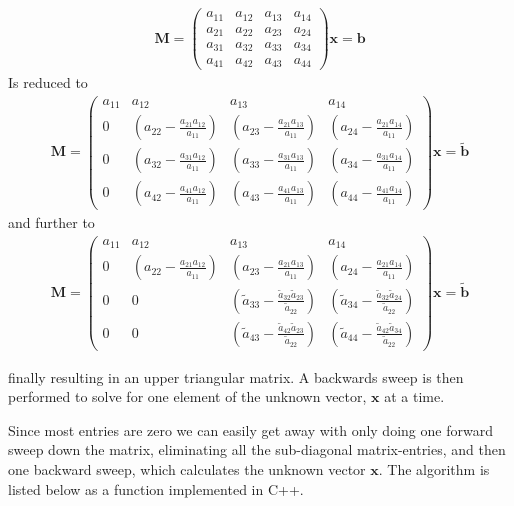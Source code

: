 \begin{align}
  \mathbf{M} = 
 \left( \begin{array}{rrrr}
 a_{11} & a_{12} & a_{13} & a_{14} \\
 a_{21} & a_{22} & a_{23} & a_{24} \\
 a_{31} & a_{32} & a_{33} & a_{34} \\
 a_{41} & a_{42} & a_{43} & a_{44}
 \end{array} \right)\mathbf{x} = \mathbf{b}
\end{align}
Is reduced to
\begin{align}
  \mathbf{M} = 
 \left( \begin{array}{rrrr}
 a_{11} & a_{12} & a_{13} & a_{14} \\
 0 & (a_{22}-\frac{a_{21}a_{12}}{a_{11}}) & (a_{23}-\frac{a_{21}a_{13}}{a_{11}}) & (a_{24}-\frac{a_{21}a_{14}}{a_{11}}) \\
 0 & (a_{32}-\frac{a_{31}a_{12}}{a_{11}}) & (a_{33}-\frac{a_{31}a_{13}}{a_{11}}) & (a_{34}-\frac{a_{31}a_{14}}{a_{11}}) \\
 0 & (a_{42}-\frac{a_{41}a_{12}}{a_{11}}) & (a_{43}-\frac{a_{41}a_{13}}{a_{11}}) & (a_{44}-\frac{a_{41}a_{14}}{a_{11}})
 \end{array} \right)\mathbf{x} = \tilde{\mathbf{b}}
\end{align}
and further to
\begin{align}
  \mathbf{M} = 
 \left( \begin{array}{rrrr}
 a_{11} & a_{12} & a_{13} & a_{14} \\
 0 & (a_{22}-\frac{a_{21}a_{12}}{a_{11}}) & (a_{23}-\frac{a_{21}a_{13}}{a_{11}}) & (a_{24}-\frac{a_{21}a_{14}}{a_{11}}) \\
 0 & 0 & (\tilde{a}_{33}-\frac{\tilde{a}_{32}\tilde{a}_{23}}{\tilde{a}_{22}}) & (\tilde{a}_{34}-\frac{\tilde{a}_{32}\tilde{a}_{24}}{\tilde{a}_{22}}) \\
 0 & 0 & (\tilde{a}_{43}-\frac{\tilde{a}_{42}\tilde{a}_{23}}{\tilde{a}_{22}}) & (\tilde{a}_{44}-\frac{\tilde{a}_{42}\tilde{a}_{34}}{\tilde{a}_{22}})
 \end{array} \right)\mathbf{x} = \tilde{\mathbf{b}}
\end{align}

finally resulting in an upper triangular matrix. A backwards sweep is then performed to solve for one element of the unknown vector, $\mathbf{x}$ at a time. 

Since most entries are zero we can easily get away with only doing one forward sweep down the matrix, eliminating all the sub-diagonal matrix-entries, and then one backward sweep, which calculates the unknown vector $\mathbf{x}$. The algorithm is listed below as a function implemented in C++.


